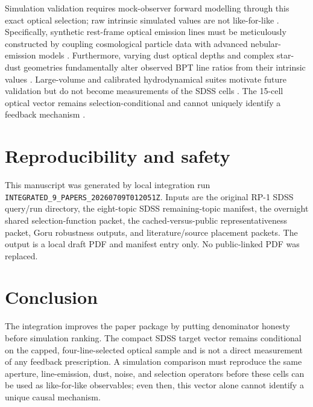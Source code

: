 \documentclass[twocolumn]{aastex702}
\begin{document}
Simulation validation requires mock-observer forward modelling through this exact optical selection; raw intrinsic simulated values are not like-for-like \citep{schaye2023}. Specifically, synthetic rest-frame optical emission lines must be meticulously constructed by coupling cosmological particle data with advanced nebular-emission models \citep{hirschmann2023}. Furthermore, varying dust optical depths and complex star-dust geometries fundamentally alter observed BPT line ratios from their intrinsic values \citep{vijayan2023}. Large-volume and calibrated hydrodynamical suites motivate future validation but do not become measurements of the SDSS cells \citep{bose2023}. The 15-cell optical vector remains selection-conditional and cannot uniquely identify a feedback mechanism \citep{kugel2023}.

\section{Reproducibility and safety}\label{sec:repro}
This manuscript was generated by local integration run \texttt{INTEGRATED\_9\_PAPERS\_20260709T012051Z}. Inputs are the original RP-1 SDSS query/run directory, the eight-topic SDSS remaining-topic manifest, the overnight shared selection-function packet, the cached-versus-public representativeness packet, Goru robustness outputs, and literature/source placement packets. The output is a local draft PDF and manifest entry only. No public-linked PDF was replaced.

\section{Conclusion}\label{sec:conclusion}
The integration improves the paper package by putting denominator honesty before simulation ranking. The compact SDSS target vector remains conditional on the capped, four-line-selected optical sample and is not a direct measurement of any feedback prescription. A simulation comparison must reproduce the same aperture, line-emission, dust, noise, and selection operators before these cells can be used as like-for-like observables; even then, this vector alone cannot identify a unique causal mechanism.
\end{document}
